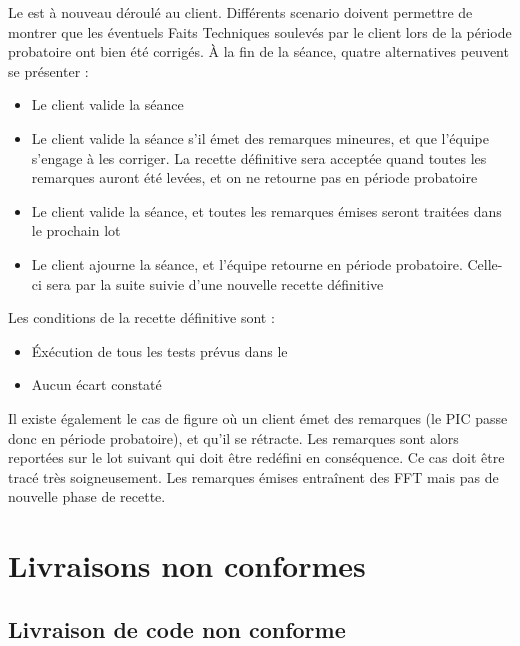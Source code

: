 Le \CDRCourt{} est à nouveau déroulé au client. Différents scenario doivent permettre de montrer que les éventuels Faits Techniques soulevés par le client lors de la période probatoire ont bien été corrigés. À la fin de la séance, quatre alternatives peuvent se présenter :
\begin{itemize}
\item Le client valide la séance
\item Le client valide la séance s’il émet des remarques mineures, et que l’équipe s’engage à les corriger. La recette définitive sera acceptée quand toutes les remarques auront été levées, et on ne retourne pas en période probatoire
\item Le client valide la séance, et toutes les remarques émises seront traitées dans le prochain lot
\item Le client ajourne la séance, et l’équipe retourne en période probatoire. Celle-ci sera par la suite suivie d’une nouvelle recette définitive \\
\end{itemize}
Les conditions de la recette définitive sont : 
\begin{itemize}
\item \'Exécution de tous les tests prévus dans le \CDR{}
\item Aucun écart constaté \\
\end{itemize}

Il existe également le cas de figure où un client émet des remarques (le PIC passe donc en période probatoire), et qu’il se rétracte. Les remarques sont alors reportées sur le lot suivant qui doit être redéfini en conséquence. Ce cas doit être tracé très soigneusement. Les remarques émises entraînent des FFT mais pas de nouvelle phase de recette.

\section{Livraisons non conformes}
\label{livraison}

\subsection{Livraison de code non conforme}

